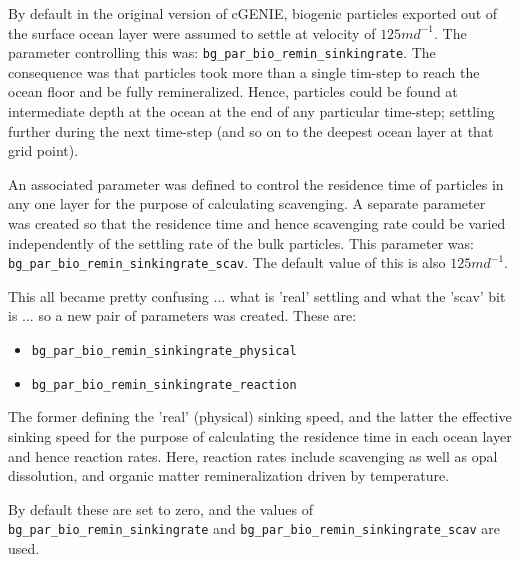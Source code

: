 \documentclass[11pt,fleqn]{book} %
\begin{document}
By default in the original version of cGENIE, biogenic particles exported out of the surface ocean layer were assumed to settle at velocity of \(125md^{-1}\). The parameter controlling this was: \break\texttt{bg\_par\_bio\_remin\_sinkingrate}. The consequence was that particles took more than a single tim-step to reach the ocean floor and be fully remineralized. Hence, particles could be found at intermediate depth at the ocean at the end of any particular time-step; settling further during the next time-step (and so on to the deepest ocean layer at that grid point).

An associated parameter was defined to control the residence time of particles in any one layer for the purpose of calculating scavenging. A separate parameter was created so that the residence time and hence scavenging rate could be varied independently of the settling rate of the bulk particles. This parameter was: \texttt{bg\_par\_bio\_remin\_sinkingrate\_scav}. The default value of this is also \(125md^{-1}\).

This all became pretty confusing ... what is 'real' settling and what the 'scav' bit is ... so a new pair of parameters was created. These are:
\vspace{1mm}
\begin{itemize}[noitemsep]
\item \texttt{bg\_par\_bio\_remin\_sinkingrate\_physical}
\item \texttt{bg\_par\_bio\_remin\_sinkingrate\_reaction}
\end{itemize}
\vspace{1mm}
The former defining the 'real' (physical) sinking speed, and the latter the effective sinking speed for the purpose of calculating the residence time in each ocean layer and hence reaction rates. Here, reaction rates include scavenging as well as opal dissolution, and organic matter remineralization driven by temperature.

By default these are set to zero, and the values of \texttt{bg\_par\_bio\_remin\_sinkingrate} and \texttt{bg\_par\_bio\_remin\_sinkingrate\_scav} are used.
\end{document}
